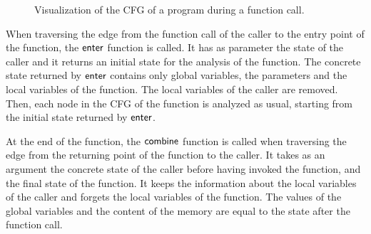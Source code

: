 \begin{figure}
  \begin{center}



\end{center}
\caption{Visualization of the CFG of a program during a function call.}\label{fig:function-cfg}
\end{figure}


When traversing the edge from the function call of the caller to the entry point of the function, the $\textsf{enter}$ function is called.
It has as parameter the state of the caller and it returns an initial state for the analysis of the function.
The concrete state returned by $\textsf{enter}$ contains only global variables, the parameters and the local variables of the function.
The local variables of the caller are removed.
Then, each node in the CFG of the function is analyzed as usual,
starting from the initial state returned by $\textsf{enter}$.

At the end of the function, the $\textsf{combine}$ function is called when traversing the edge from the returning point of the function to the caller.
It takes as an argument the concrete state of the caller before having invoked the function,
and the final state of the function.
It keeps the information about the local variables of the caller and forgets the local variables of the function.
The values of the global variables and the content of the memory are equal to the state after the function call.

